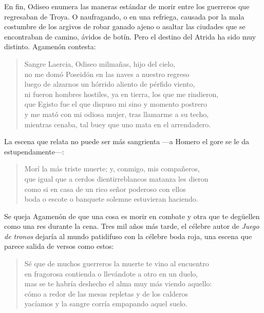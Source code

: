 \documentclass[11pt,a4paper]{article}
\begin{document}
En fin, Odiseo enumera las maneras estándar de morir entre los guerreros que regresaban de Troya. O naufragando, o en una refriega, causada por la mala costumbre de los argivos de robar ganado ajeno o asaltar las ciudades que se encontraban de camino, ávidos de botín. Pero el destino del Atrida ha sido muy distinto. Agamenón contesta:

\begin{verse}
Sangre Laercia, Odiseo milmañas, hijo del cielo,\\
no me domó Poseidón en las naves a nuestro regreso\\
luego de alzarnos un hórrido aliento de pérfido viento,\\
ni fueron hombres hostiles, ya en tierra, los que me rindieron,\\
que Egisto fue el que dispuso mi sino y momento postrero\\
y me mató con mi odiosa mujer, tras llamarme a su techo,\\
mientras cenaba, tal buey que uno mata en el arrendadero.
\end{verse}

La escena que relata no puede ser más sangrienta ---a Homero el gore se le da estupendamente---:

\begin{verse}
Morí la más triste muerte; y, conmigo, mis compañeros,\\
que igual que a cerdos dientirreblancos matanza les dieron\\
como si en casa de un rico señor poderoso con ellos\\
boda o escote o banquete solemne estuvieran haciendo.
\end{verse}

Se queja Agamenón de que una cosa es morir en combate y otra que te degüellen como una res durante la cena. Tres mil años más tarde, el célebre autor de \emph{Juego de tronos} dejaría al mundo patidifuso con la célebre boda roja, una escena que parece salida de versos como estos:

\begin{verse}
Sé que de muchos guerreros la muerte te vino al encuentro\\
en fragorosa contienda o llevándote a otro en un duelo,\\
mas se te habría deshecho el alma muy más viendo aquello:\\
cómo a redor de las mesas repletas y de los calderos\\
yacíamos y la sangre corría empapando aquel suelo.
\end{verse}
\end{document}
